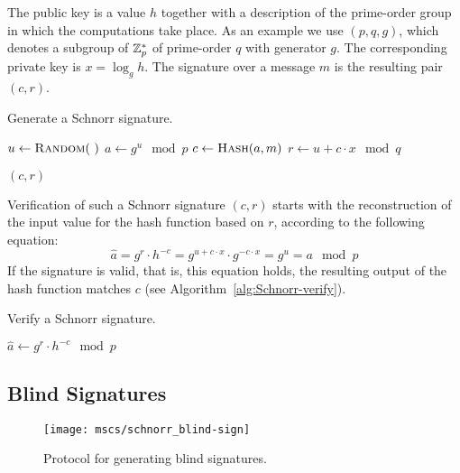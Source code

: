 The public key is a value $h$ together with a description of the prime-order
group in which the computations take place. As an example we use $(p, q, g)$,
which denotes a subgroup of $\mathbb{Z}^*_p$ of prime-order $q$ with generator $g$. The
corresponding private key is $x = \log_g h$. The signature over a message $m$
is the resulting pair $(c, r)$.

\begin{algorithm}
  \caption{Generate a Schnorr signature.}
  \label{alg:Schnorr-sign}
  \addtolength{\baselineskip}{1mm}
  \begin{algorithmic}[1]
      \State $u \gets \Call{Random}{~}$
      \State $a \gets g^u \mod p$
      \State $c \gets \Call{Hash}{a, m}$
      \State $r \gets u + c \cdot x \mod q$

      \Return $(c, r)$
    \EndFunction
  \end{algorithmic}
\end{algorithm}

Verification of such a Schnorr signature $(c, r)$ starts with the reconstruction
of the input value for the hash function based on $r$, according to the
following equation:
\begin{equation*}
  \hat{a} = g^r \cdot h^{-c} = g^{u + c \cdot x} \cdot g^{-c \cdot x} = g^u = a \mod p
\end{equation*}
If the signature is valid, that is, this equation holds, the resulting output of
the hash function matches $c$ (see Algorithm~\ref{alg:Schnorr-verify}).

\begin{algorithm}
  \caption{Verify a Schnorr signature.}
  \label{alg:Schnorr-verify}
  \addtolength{\baselineskip}{1mm}
  \begin{algorithmic}[1]
      \State $\hat{a} \gets g^r \cdot h^{-c} \mod p$

        \Return {}
      \EndIf

      \Return {}
    \EndFunction
  \end{algorithmic}
\end{algorithm}

\subsection{Blind Signatures}

\begin{figure}[ht]
  \centering
  \texttt{[image: mscs/schnorr\_blind-sign]}
  \caption{Protocol for generating blind signatures.}
  \label{msc:schnorr_blind-sign}
\end{figure}


